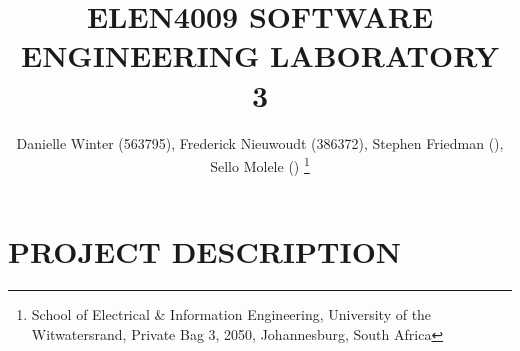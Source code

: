 \documentclass[10pt,twocolumn]{witseiepaper}
\begin{document}
\title{ELEN4009 SOFTWARE ENGINEERING LABORATORY 3}

\author{Danielle Winter (563795), Frederick Nieuwoudt (386372), Stephen Friedman (), Sello Molele ()
\thanks{School of Electrical \& Information Engineering, University of the
Witwatersrand, Private Bag 3, 2050, Johannesburg, South Africa}
}


%
\abstract{}

\keywords{}


\maketitle
\thispagestyle{empty}\pagestyle{empty}


%
\section{PROJECT DESCRIPTION}
\end{document}
